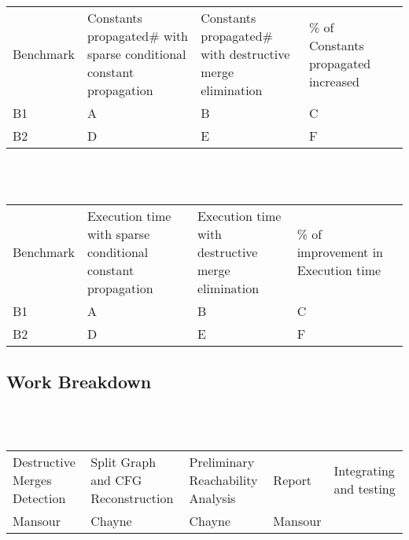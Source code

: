 \documentclass{article}
\begin{document}
\begin{adjustbox}{center}
\renewcommand{\arraystretch}{2}
\begin{tabular}{| C{3cm} | C{3cm} | C{3cm} | C{3cm} | C{3cm} |}
\hline
Benchmark & Constants propagated\# with sparse conditional constant propagation & Constants propagated\# with destructive merge elimination & \% of Constants propagated increased \\  
B1 & A & B & C  \\ 
B2 & D & E & F  \\ 

\end{tabular}
\end{adjustbox}

~\\~
\begin{adjustbox}{center}
\renewcommand{\arraystretch}{2}
\begin{tabular}{| C{3cm} | C{3cm} | C{3cm} | C{3cm} | C{3cm} |}
\hline
Benchmark & Execution time with sparse conditional constant propagation & Execution time with destructive merge elimination & \% of improvement in Execution time \\  
B1 & A & B & C  \\ 
B2 & D & E & F  \\ 
\end{tabular}
\end{adjustbox}
\subsection{Work Breakdown}
~\\~
\begin{adjustbox}{center}
\renewcommand{\arraystretch}{2}
\begin{tabular}{| C{3cm} | C{3cm} | C{3cm} | C{3cm} | C{3cm} |}
\hline
Destructive Merges Detection & Split Graph and CFG Reconstruction & Preliminary Reachability Analysis & Report & Integrating and testing \\  
Mansour & Chayne & Chayne & Mansour &  \\ 

\end{tabular}
\end{adjustbox}
\end{document}
